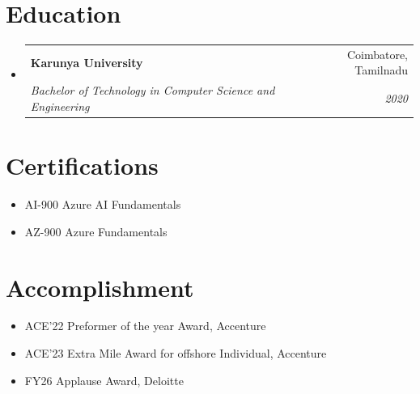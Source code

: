 \documentclass[letterpaper,11pt]{article}
\makeatletter
\newcommand{\resumeItem}[1]{
  \item\small{
    {#1 \vspace{-2pt}}
  }
}
\newcommand{\resumeSubheading}[4]{
  \vspace{-2pt}\item
    \begin{tabular*}{0.97\textwidth}[t]{l@{\extracolsep{\fill}}r}
      \textbf{#1} & #2 \\
      \textit{\small#3} & \textit{\small #4} \\
    \end{tabular*}\vspace{-7pt}
}
\newcommand{\resumeSubHeadingListStart}{\begin{itemize}[leftmargin=0.15in, label={}]}
\newcommand{\resumeSubHeadingListEnd}{\end{itemize}}
\newcommand{\resumeItemListStart}{\begin{itemize}}
\newcommand{\resumeItemListEnd}{\end{itemize}\vspace{-5pt}}
\makeatother
\begin{document}
\section{Education}
  \resumeSubHeadingListStart
    \resumeSubheading
      {Karunya University}{Coimbatore, Tamilnadu}
      {Bachelor of Technology in Computer Science and Engineering}{2020}
  \resumeSubHeadingListEnd


\section{Certifications}
 \resumeItemListStart
  \resumeItem{AI-900 Azure AI Fundamentals}
  \resumeItem{AZ-900 Azure Fundamentals}
 \resumeItemListEnd

\section{Accomplishment}
 \resumeItemListStart
  \resumeItem{ACE'22 Preformer of the year Award, Accenture}
  \resumeItem{ACE'23 Extra Mile Award for offshore Individual, Accenture}
  \resumeItem{FY26 Applause Award, Deloitte}
\resumeItemListEnd
\end{document}
